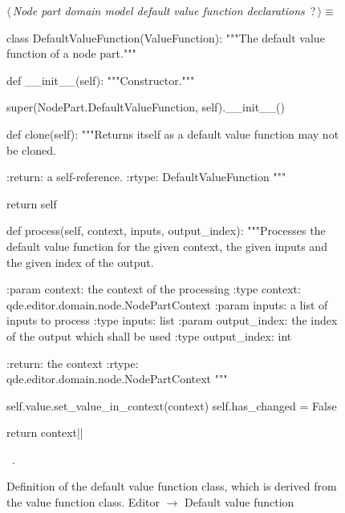 \documentclass[%
    a4paper,    %
    justified,  %
    nobib,      %
    openany     %
]{tufte-book}
\begin{document}
\begin{figure}
\begin{flushleft} \small
\begin{minipage}{\linewidth}\label{scrap114}\raggedright\small
{} $\langle\,${\itshape Node part domain model default value function declarations}\nobreak\ {\footnotesize {?}}$\,\rangle\equiv$
\vspace{-1ex}
\begin{pythoncode}
class DefaultValueFunction(ValueFunction):
    """The default value function of a node part."""

    def __init__(self):
        """Constructor."""

        super(NodePart.DefaultValueFunction, self).__init__()

    def clone(self):
        """Returns itself as a default value function may not be cloned.

        :return: a self-reference.
        :rtype: DefaultValueFunction
        """

        return self

    def process(self, context, inputs, output_index):
        """Processes the default value function for the given context, the given inputs
        and the given index of the output.

        :param context: the context of the processing
        :type  context: qde.editor.domain.node.NodePartContext
        :param inputs: a list of inputs to process
        :type inputs: list
        :param output_index: the index of the output which shall be used
        :type output_index: int

        :return: the context
        :rtype:  qde.editor.domain.node.NodePartContext
        """

        self.value.set_value_in_context(context)
        self.has_changed = False

        return context|\NWsep|
\end{pythoncode}
\vspace{1.5ex}
\footnotesize
\begin{list}{}{\setlength{\itemsep}{-\parsep}\setlength{\itemindent}{-\leftmargin}}
\item \NWtxtMacroRefIn\ .

\item{}
\end{list}
\end{minipage}\vspace{4ex}
\end{flushleft}
\caption{Definition of the default value function class, which is derived from
  the value function class.
  \newline{}\newline{}Editor $\rightarrow$ Default value function}
\label{editor:lst:default-value-function}
\end{figure}
\end{document}
